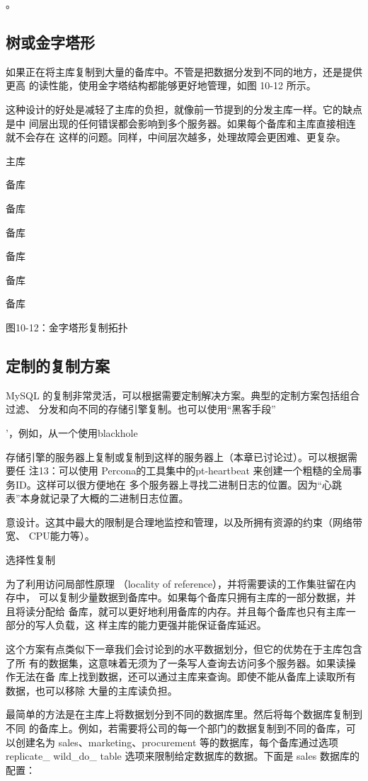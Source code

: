 。

\subsection{树或金字塔形}
如果正在将主库复制到大量的备库中。不管是把数据分发到不同的地方，还是提供更高
的读性能，使用金字塔结构都能够更好地管理，如图 10-12 所示。

这种设计的好处是减轻了主库的负担，就像前一节提到的分发主库一样。它的缺点是中
间层出现的任何错误都会影响到多个服务器。如果每个备库和主库直接相连就不会存在
这样的问题。同样，中间层次越多，处理故障会更困难、更复杂。

主库

备库

备库

备库

备库

备库

备库

图10-12：金字塔形复制拓扑

\subsection{定制的复制方案}
MySQL 的复制非常灵活，可以根据需要定制解决方案。典型的定制方案包括组合过滤、
分发和向不同的存储引擎复制。也可以使用“黑客手段”

'，例如，从一个使用blackhole

存储引擎的服务器上复制或复制到这样的服务器上（本章已讨论过）。可以根据需要任
注13：可以使用 Percona的工具集中的pt-heartbeat 来创建一个粗糙的全局事务ID。这样可以很方便地在
多个服务器上寻找二进制日志的位置。因为“心跳表”本身就记录了大概的二进制日志位置。

意设计。这其中最大的限制是合理地监控和管理，以及所拥有资源的约束（网络带宽、
CPU能力等）。

选择性复制

为了利用访问局部性原理 （locality of reference），并将需要读的工作集驻留在内存中，
可以复制少量数据到备库中。如果每个备库只拥有主库的一部分数据，并且将读分配给
备库，就可以更好地利用备库的内存。并且每个备库也只有主库一部分的写人负载，这
样主库的能力更强并能保证备库延迟。

这个方案有点类似下一章我们会讨论到的水平数据划分，但它的优势在于主库包含了所
有的数据集，这意味着无须为了一条写人查询去访问多个服务器。如果读操作无法在备
库上找到数据，还可以通过主库来查询。即使不能从备库上读取所有数据，也可以移除
大量的主库读负担。

最简单的方法是在主库上将数据划分到不同的数据库里。然后将每个数据库复制到不同
的备库上。例如，若需要将公司的每一个部门的数据复制到不同的备库，可以创建名为
sales、marketing、procurement 等的数据库，每个备库通过选项 replicate\_ wild\_do\_
table 选项来限制给定数据库的数据。下面是 sales 数据库的配置：

